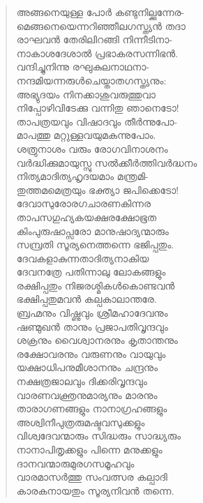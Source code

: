 \begin{verse}
അങ്ങനെയുള്ള പോര്‍ കണ്ടുനില്ക്കുന്നേര-\\
മെങ്ങനെയെന്നറിഞ്ഞീലഗസ്ത്യന്‍ തദാ\\
രാഘവന്‍ തേരിലിറങ്ങി നിന്നീടിനാ-\\
നാകാശദേശാല്‍ പ്രഭാകരസന്നിഭന്‍.\\
വന്ദിച്ചുനിന്നു രഘുകുലനാഥനാ-\\
നന്ദമിയന്നരുള്‍ചെയ്താതഗസ്ത്യനും:\\
അഭ്യുദയം നിനക്കാശുവരുത്തുവാ\\
നിപ്പോഴിവിടേക്കു വന്നിതു ഞാനെടോ!\\
താപത്രയവും വിഷാദവും തീര്‍ന്നുപോ-\\
മാപത്തു മറ്റുള്ളവയുമകന്നുപോം.\\
ശത്രുനാശം വരും രോഗവിനാശനം\\
വര്‍ദ്ധിക്കുമായുസ്സു സല്‍ക്കീര്‍ത്തിവര്‍ദ്ധനം\\
നിത്യമാദിത്യഹൃദയമാം മന്ത്രമി-\\
തുത്തമമെത്രയും ഭക്ത്യാ ജപിക്കെടോ!\\
ദേവാസുരോരഗചാരണകിന്നര\\
താപസഗുഹ്യകയക്ഷരക്ഷോഭൂത\\
കിംപുരുഷാപ്സരോ മാനുഷാദ്യന്മാരും\\
സമ്പ്രതി സൂര്യനെത്തന്നെ ഭജിപ്പതും.\\
ദേവകളാകുന്നതാദിത്യനാകിയ\\
ദേവനത്രേ പതിന്നാലു ലോകങ്ങളും\\
രക്ഷിപ്പതും നിജരശ്മികള്‍കൊണ്ടവന്‍\\
ഭക്ഷിപ്പതുമവന്‍ കല്പകാലാന്തരേ.\\
ബ്രഹ്മനും വിഷ്ണുവും ശ്രീമഹാദേവനും\\
ഷണ്മുഖന്‍ താനും പ്രജാപതിവൃന്ദവും\\
ശക്രനും വൈശ്വാനരനും കൃതാന്തനും\\
രക്ഷോവരനും വരുണനും വായുവും\\
യക്ഷാധിപനുമീശാനനും ചന്ദ്രനും\\
നക്ഷത്രജാലവും ദിക്കരിവൃന്ദവും\\
വാരണവക്ത്രനുമാര്യനും മാരനും\\
താരാഗണങ്ങളും നാനാഗ്രഹങ്ങളും\\
അശ്വിനീപുത്രരുമഷ്ടവസുക്കളും\\
വിശ്വദേവന്മാരും സിദ്ധരും സാദ്ധ്യരും\\
നാനാപിതൃക്കളും പിന്നെ മനുക്കളും\\
ദാനവന്മാരുമുരഗസമൂഹവും\\
വാരമാസര്‍ത്തു സംവത്സര കല്പാദി\\
കാരകനായതും സൂര്യനിവന്‍ തന്നെ.\\

\end{verse}
